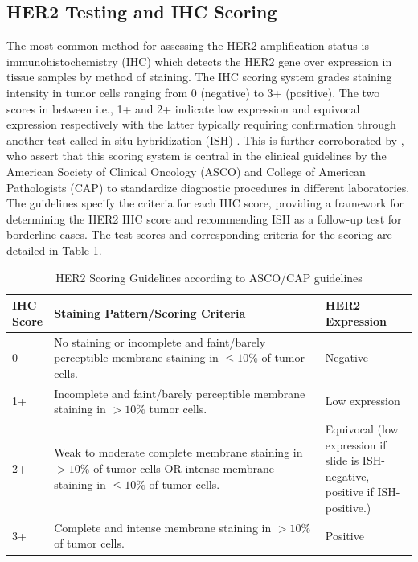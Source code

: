 \subsection{HER2 Testing and IHC Scoring}

The most common method for assessing the HER2 amplification status is immunohistochemistry (IHC) which detects the HER2 gene over expression in tissue samples by method of staining. The IHC scoring system grades staining intensity in tumor cells ranging from 0 (negative) to 3+ (positive). The two scores in between i.e., 1+ and 2+ indicate low expression and equivocal expression respectively with the latter typically requiring confirmation through another test called in situ hybridization (ISH) \parencite{Ivanova2024StandardizedCancer.}. This is further corroborated by  \textcite{Wolff2018HumanUpdate}, who assert that this scoring system is central in the clinical guidelines by the American Society of Clinical Oncology (ASCO) and College of American Pathologists (CAP) to standardize diagnostic procedures in different laboratories. The guidelines specify the criteria for each IHC score, providing a framework for determining the HER2 IHC  score and recommending ISH as a follow-up test for borderline cases. The test scores and corresponding criteria for the scoring are detailed in Table \ref{tab:HER2 IHC Scoring Guidelines}. 

\begin{table}[H]
\begin{center}
\begin{tabular}{|p{0.07\linewidth}|>{\raggedright\arraybackslash}p{0.7\linewidth}|>{\raggedright\arraybackslash}p{0.23\linewidth}|}
\hline 
\textbf{IHC Score}& \textbf{Staining Pattern/Scoring Criteria}& \textbf{HER2 Expression}\\ \hline 
0& No staining or incomplete and faint/barely perceptible membrane staining in $\leq 10 \% $ of tumor cells.& Negative\\ \hline
1+& Incomplete and faint/barely perceptible membrane staining in $> 10\%$ tumor cells.&  Low expression\\ \hline
2+& Weak to moderate complete membrane staining in $>10\%$ of tumor cells OR intense membrane staining in $\leq 10\%$ of tumor cells.& Equivocal (low expression if slide is ISH-negative, positive if ISH-positive.)\\ \hline
 3+& Complete and intense membrane staining in $> 10\%$ of tumor cells.&Positive\\\hline
\end{tabular}
\caption[HER2 Scoring Guidelines]{HER2 Scoring Guidelines according to ASCO/CAP guidelines \parencite{Ivanova2024StandardizedCancer.}}\label{tab:HER2 IHC Scoring Guidelines}
\end{center}
\end{table}

